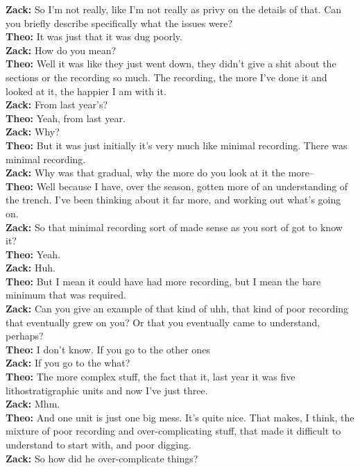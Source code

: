 \documentclass[
]{article}
\begin{document}
\textbf{Zack:} So I'm not really, like I'm not really as privy on the
details of that. Can you briefly describe specifically what the issues
were?\\
\textbf{Theo:} It was just that it was dug poorly.\\
\textbf{Zack:} How do you mean?\\
\textbf{Theo:} Well it was like they just went down, they didn't give a
shit about the sections or the recording so much. The recording, the
more I've done it and looked at it, the happier I am with it.\\
\textbf{Zack:} From last year's?\\
\textbf{Theo:} Yeah, from last year.\\
\textbf{Zack:} Why?\\
\textbf{Theo:} But it was just initially it's very much like minimal
recording. There was minimal recording.\\
\textbf{Zack:} Why was that gradual, why the more do you look at it the
more--\\
\textbf{Theo:} Well because I have, over the season, gotten more of an
understanding of the trench. I've been thinking about it far more, and
working out what's going on.\\
\textbf{Zack:} So that minimal recording sort of made sense as you sort
of got to know it?\\
\textbf{Theo:} Yeah.\\
\textbf{Zack:} Huh.\\
\textbf{Theo:} But I mean it could have had more recording, but I mean
the bare minimum that was required.\\
\textbf{Zack:} Can you give an example of that kind of uhh, that kind of
poor recording that eventually grew on you? Or that you eventually came
to understand, perhaps?\\
\textbf{Theo:} I don't know. If you go to the other ones\\
\textbf{Zack:} If you go to the what?\\
\textbf{Theo:} The more complex stuff, the fact that it, last year it
was five lithostratigraphic units and now I've just three.\\
\textbf{Zack:} Mhm.\\
\textbf{Theo:} And one unit is just one big mess. It's quite nice. That
makes, I think, the mixture of poor recording and over-complicating
stuff, that made it difficult to understand to start with, and poor
digging.\\
\textbf{Zack:} So how did he over-complicate things?\\
\end{document}
